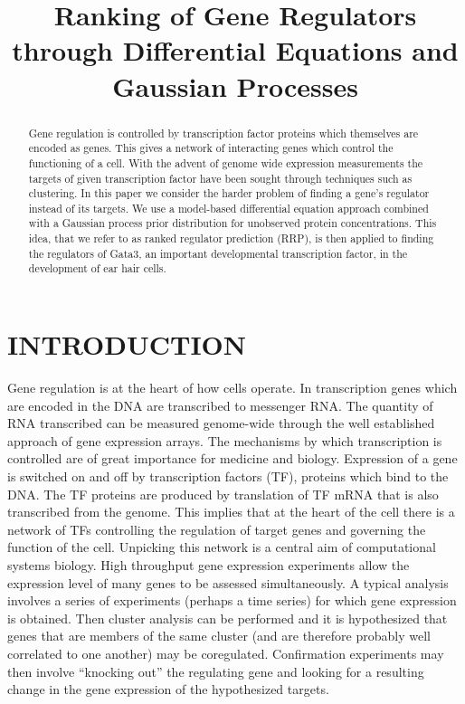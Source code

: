 \documentclass{article}
\title{Ranking of Gene Regulators through Differential Equations and Gaussian Processes}
\begin{document}
\maketitle

\begin{abstract}
  Gene regulation is controlled by transcription factor proteins which
  themselves are encoded as genes. This gives a network of interacting
  genes which  control the functioning of  a cell. With  the advent of
  genome   wide   expression  measurements   the   targets  of   given
  transcription  factor have  been sought  through techniques  such as
  clustering. In this paper we  consider the harder problem of finding
  a  gene's regulator instead  of its  targets.  We  use a  model-based
  differential  equation  approach combined  with  a Gaussian  process
  prior distribution for unobserved protein concentrations. This idea,
  that  we refer  to as  ranked  regulator prediction  (RRP), is  then
  applied   to  finding   the  regulators   of  Gata3,   an  important
  developmental transcription  factor, in the development  of ear hair
  cells.
\end{abstract}

\sloppy

\section{INTRODUCTION}

Gene regulation is at the heart of how cells operate. In transcription
genes  which are  encoded in  the  DNA are  transcribed to  messenger
RNA.  The  quantity of  RNA  transcribed  can  be measured  genome-wide
through the  well established approach of gene  expression arrays. The
mechanisms  by   which  transcription  is  controlled   are  of  great
importance for medicine and biology.  Expression of a gene is switched
on  and off by  transcription factors  (TF), proteins
which bind to the DNA. The  TF proteins are produced by translation of
TF mRNA  that  is  also
transcribed from  the genome.  This implies that  at the heart  of the
cell there is a network of TFs controlling the regulation of target genes and
governing  the function  of  the  cell. Unpicking  this  network is  a
central  aim of  computational systems  biology. High  throughput gene
expression experiments allow the expression  level of many genes to be
assessed  simultaneously.  A typical  analysis  involves  a series  of
experiments  (perhaps a  time  series) for  which  gene expression  is
obtained.  Then   cluster  analysis  can   be  performed  and   it  is
hypothesized that genes that are  members of the same cluster (and are
therefore   probably  well   correlated   to  one   another)  may   be
coregulated.  Confirmation  experiments  may then  involve  ``knocking
out'' the  regulating gene and looking  for a resulting  change in the
gene expression of the hypothesized targets.
\end{document}
